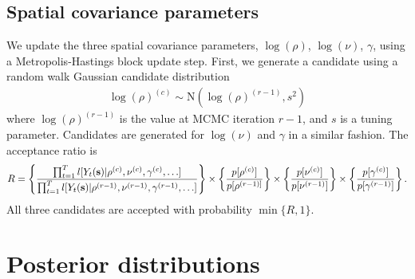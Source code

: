 \subsection*{Spatial covariance parameters}
We update the three spatial covariance parameters, $\log(\rho)$, $\log(\nu)$, $\gamma$, using a Metropolis-Hastings block update step.
First, we generate a candidate using a random walk Gaussian candidate distribution
\begin{align*}
  \log(\rho)^{(c)} \sim \text{N}(\log(\rho)^{(r - 1)}, s^2)
\end{align*}
where $\log(\rho)^{(r-1)}$ is the value at MCMC iteration $r - 1$, and $s$ is a tuning parameter.
Candidates are generated for $\log(\nu)$ and $\gamma$ in a similar fashion.
The acceptance ratio is
\begin{align*}
  R = \left\{ \frac{ \prod_{t = 1}^{T} l[Y_t(\mathbf{s}) | \rho^{(c)}, \nu^{(c)}, \gamma^{(c)}, \ldots] }{\prod_{t = 1}^{T} l[Y_t(\mathbf{s}) | \rho^{(r-1)}, \nu^{(r-1)}, \gamma^{(r-1)}, \ldots] } \right\} \times \left\{ \frac{ p[\rho^{(c)}] }{ p[\rho^{(r - 1)] } } \right\} \times \left\{ \frac{ p[\nu^{(c)}] }{ p[\nu^{(r - 1)}] } \right\} \times \left\{ \frac{ p[ \gamma^{(c)} ] }{ p[\gamma^{(r - 1)} ] } \right\}.
\end{align*}
All three candidates are accepted with probability $\min\{R, 1\}$.

\section{Posterior distributions} \label{sta:posterior}

